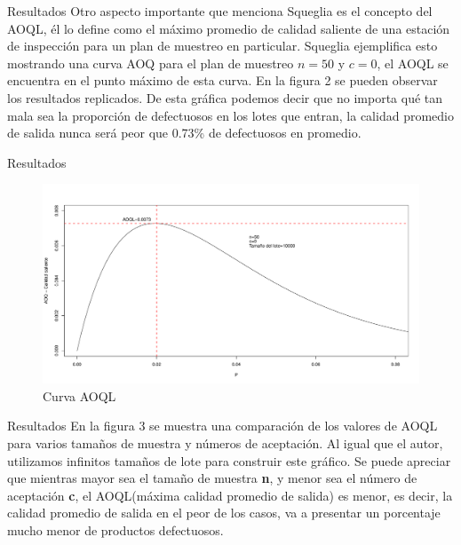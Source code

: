 \documentclass[10pt]{beamer}
\begin{document}
\begin{frame}{Resultados}
Otro aspecto importante que menciona Squeglia es el concepto del AOQL, él lo define como el máximo promedio de calidad saliente de una estación de inspección para un plan de muestreo en particular. Squeglia ejemplifica esto mostrando una curva AOQ para el plan de muestreo $n=50$ y $c=0$, el AOQL se encuentra en el punto máximo de esta curva. En la figura 2 se pueden observar los resultados replicados. De esta gráfica podemos decir que no importa qué tan mala sea la proporción de defectuosos en los lotes que entran, la calidad promedio de salida nunca será peor que 0.73\% de defectuosos en promedio.
\end{frame}

\begin{frame}{Resultados}
\begin{figure}[h!]
  \centering
  \includegraphics[scale=0.34]{FigurasUV/Figura3.pdf}
  \caption{Curva AOQL}
\end{figure}
\end{frame}

\begin{frame}{Resultados}
En la figura 3 se muestra una comparación de los valores de AOQL para varios tamaños de muestra y números de aceptación. Al igual que el autor, utilizamos infinitos tamaños de lote para construir este gráfico. Se puede apreciar que mientras mayor sea el tamaño de muestra \textbf{n}, y menor sea el número de aceptación \textbf{c}, el AOQL(máxima calidad promedio de salida) es menor, es decir, la calidad promedio de salida en el peor de los casos, va a presentar un porcentaje mucho menor de productos defectuosos.
\end{frame}
\end{document}
